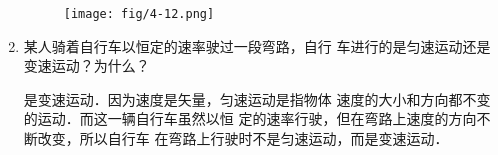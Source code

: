 \begin{enumerate}
\begin{solution}
\begin{figure}[htp]
    \centering
    \texttt{[image: fig/4-12.png]}
    \caption{}
\end{figure}
\end{solution}
\item 某人骑着自行车以恒定的速率驶过一段弯路，自行
车进行的是匀速运动还是变速运动？为什么？

\begin{solution}
    是变速运动．因为速度是矢量，匀速运动是指物体
    速度的大小和方向都不变的运动．而这一辆自行车虽然以恒
    定的速率行驶，但在弯路上速度的方向不断改变，所以自行车
    在弯路上行驶时不是匀速运动，而是变速运动．
\end{solution}
\end{enumerate}



